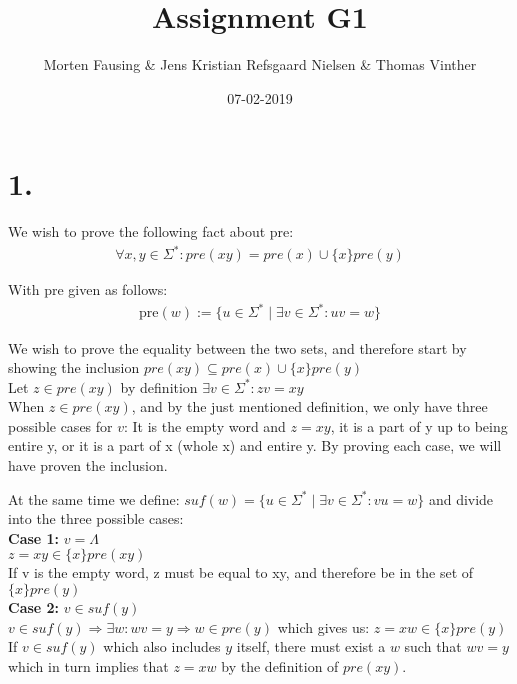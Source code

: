 \documentclass{article}
\theoremstyle{remark}
\numberwithin{equation}{section}
\begin{document}
	\author{Morten Fausing \& Jens Kristian Refsgaard Nielsen \& Thomas Vinther }
	\title{Assignment G1}
	\date{07-02-2019}
	\maketitle
	\section*{1.}
	We wish to prove the following fact about pre:  
	\begin{align*}
	\forall x,y \in \Sigma^{*}: pre(xy)= pre(x) \cup \{x\}pre(y) 
	\end{align*}
	
	With pre given as follows: 
	\begin{align*}
	\text{pre}(w):=\{ u\in\Sigma^* \mid \exists v\in\Sigma^* : uv = w \}
	\end{align*}	
	
	We wish to prove the equality between the two sets, and therefore start by showing the inclusion $pre(xy) \subseteq pre(x) \cup \{x\}pre(y) $\\
	Let $z \in pre(xy)$ by definition $ \exists v \in \Sigma^* : zv=xy$\\
	When $z \in pre(xy)$, and by the just mentioned definition, we only have three possible cases for $v$: It is the empty word and $z=xy$, it is a part of y up to being entire y, or it is a part of x (whole x) and entire y. By proving each case, we will have proven the inclusion.
	
	At the same time we define: $ suf(w)=\{u\in \Sigma^* \mid\exists v \in \Sigma^* : vu = w\}$ and divide into the three possible cases: \\
	
	\textbf{Case 1:} $v=\Lambda$ \\
	$ z = xy \in \{x\} pre(xy)$\\
	If v is the empty word, z must be equal to xy, and therefore be in the set of $\{x\}pre(y)$\\
	
	\textbf{Case 2:} $ v \in suf(y) $\\
	$v \in suf(y) \Rightarrow \exists w : wv = y \Rightarrow w\in pre(y)$ which gives us: $z=xw \in \{x\} pre(y)$\\
	If $v \in suf(y)$ which also includes $y$ itself, there must exist a $w$ such that $wv=y$ which in turn implies that $z=xw$ by the definition of $pre(xy)$.\\
	
\end{document}
